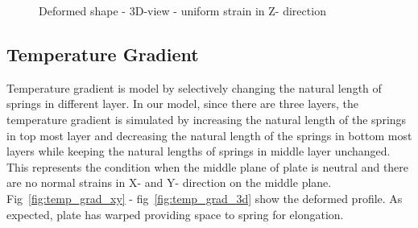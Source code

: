 \begin{figure}[!htbp]
\begin{minipage}{0.3\textwidth}
    \caption{Deformed shape - 3D-view - uniform strain in Z- direction}
    \label{fig:uniform_zz_3d}
\end{minipage}
\end{figure}

 \subsection{Temperature Gradient}
 Temperature gradient is model by selectively changing the natural length of springs in different layer. In our model, since there are three layers, the temperature gradient is simulated by increasing the natural length of the springs in top most layer and decreasing the natural length of the springs in bottom most layers while keeping the natural lengths of springs in middle layer unchanged. This represents the condition when the middle plane of plate is neutral and there are no normal strains in X- and Y- direction on the middle plane. Fig~\ref{fig:temp_grad_xy} - fig~\ref{fig:temp_grad_3d} show the deformed profile. As expected, plate has warped providing space to spring for elongation.
 
